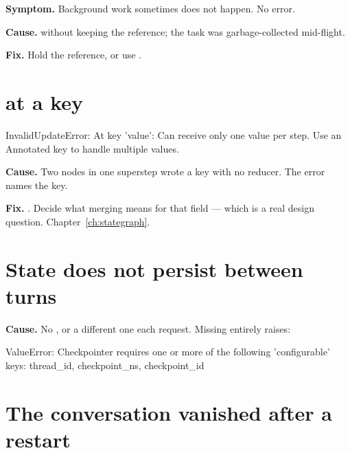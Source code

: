 \textbf{Symptom.} Background work sometimes does not happen. No error.

\textbf{Cause.}  without keeping the reference; the task was
garbage-collected mid-flight.

\textbf{Fix.} Hold the reference, or use .

\section{\texorpdfstring{}{InvalidUpdateError} at a key}
\label{sec:tsD}

\begin{console}
InvalidUpdateError: At key 'value': Can receive only one value per step.
Use an Annotated key to handle multiple values.
\end{console}

\textbf{Cause.} Two nodes in one superstep wrote a key with no reducer. The error
names the key.

\textbf{Fix.} . Decide what merging means for that
field --- which is a real design question. Chapter~\ref{ch:stategraph}.

\section{State does not persist between turns}
\label{sec:tsE}

\textbf{Cause.} No , or a different one each request. Missing
entirely raises:

\begin{console}
ValueError: Checkpointer requires one or more of the following 'configurable'
keys: thread_id, checkpoint_ns, checkpoint_id
\end{console}

\section{The conversation vanished after a restart}
\label{sec:tsF}

